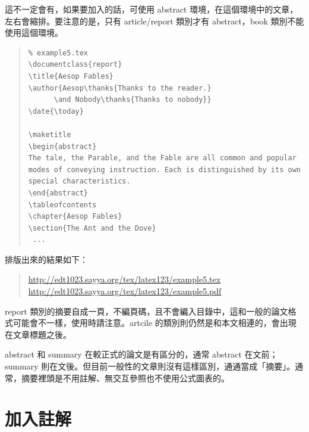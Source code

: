 這不一定會有，如果要加入的話，可使用 {\ttfamily abstract} 環境，在這個環境中的文章，左右會縮排。要注意的是，只有 {\ttfamily article/report} 類別才有 abstract，{\ttfamily book} 類別不能使用這個環境。

\begin{quote}
   \begin{verbatim}
% example5.tex
\documentclass{report}
\title{Aesop Fables}
\author{Aesop\thanks{Thanks to the reader.}
      \and Nobody\thanks{Thanks to nobody}}
\date{\today}

\maketitle
\begin{abstract}
The tale, the Parable, and the Fable are all common and popular
modes of conveying instruction. Each is distinguished by its own
special characteristics.
\end{abstract}
\tableofcontents
\chapter{Aesop Fables}
\section{The Ant and the Dove}
 ...
\end{verbatim}
\end{quote}

排版出來的結果如下：

\begin{quote}
   \url{http://edt1023.sayya.org/tex/latex123/example5.tex}\\
   \url{http://edt1023.sayya.org/tex/latex123/example5.pdf}
\end{quote}

{\ttfamily report} 類別的摘要自成一頁，不編頁碼，且不會編入目錄中，這和一般的論文格式可能會不一樣，使用時請注意。{\ttfamily artcile} 的類別則仍然是和本文相連的，會出現在文章標題之後。

{\ttfamily abstract} 和 summary 在較正式的論文是有區分的，通常 abstract 在文前；summary 則在文後。但目前一般性的文章則沒有這樣區別，通通當成「摘要」。通常，摘要裡頭是不用註解、無交互參照也不使用公式圖表的。


\section{加入註解}
\label{sec:footnote}

